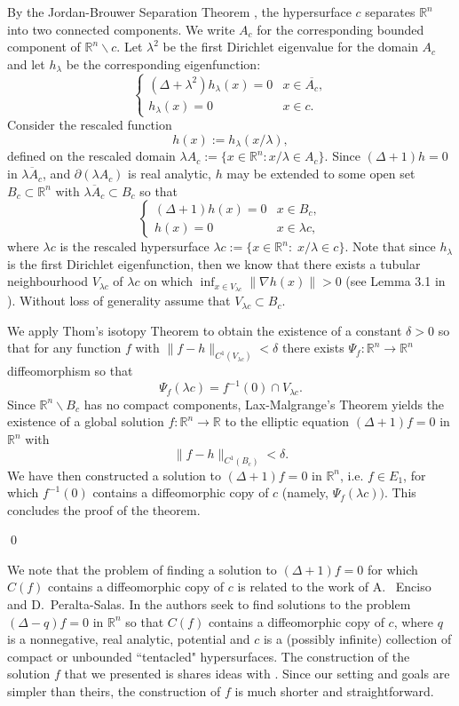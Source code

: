 \documentclass[11pt,reqno]{amsart}
\newcommand{\R}{{\mathbb R}}
\theoremstyle{definition}
\begin{document}
By the Jordan-Brouwer Separation Theorem \cite{Li}, the hypersurface $c$ separates $\R^n$ into two connected components. We write $A_c$ for the corresponding bounded component of $\R^n \backslash c$.
Let $\lambda^2$ be the first Dirichlet eigenvalue for the domain $A_c$ and let $h_\lambda$ be the corresponding eigenfunction: 
$$\begin{cases}
(\Delta + \lambda^2 )h_\lambda(x)=0& x \in \overline{A_c},\\
 h_\lambda(x)=0& x \in c.
\end{cases}$$
Consider the rescaled function $$h(x):=h_\lambda(x/\lambda),$$ defined on the rescaled domain $\lambda A_c:=\{x \in \R^n:  x/\lambda \in A_c\}$. 
Since $(\Delta + 1)h=0$ in $\overline{\lambda A_c}$, and $\partial (\lambda A_c)$ is real analytic, $h$ may be extended to some open set $B_c\subset \R^n$ with $\overline{\lambda A_c} \subset B_c$ so that
$$\begin{cases}
(\Delta + 1)h(x)=0& x \in B_c,\\
 h(x)=0& x \in  \lambda c,
\end{cases}$$
where $\lambda c$ is the rescaled hypersurface $\lambda c:= \{x \in \R^n:\; x/\lambda \in c\}$.
Note that since $h_\lambda$ is the first Dirichlet eigenfunction, then we know that there exists a tubular neighbourhood $V_{\lambda c}$ of $\lambda c$ on which  $\inf_{x \in V_{\lambda c}}\|\nabla h(x)\|>0$ (see Lemma 3.1 in \cite{BHM}). Without loss of generality assume that  $V_{\lambda c}\subset B_c$.

We apply Thom's isotopy Theorem \cite[Thm 20.2]{AR} to obtain the existence of a constant $\delta>0$ 
so that for any function $f$ with $\|f-h\|_{C^1(V_{\lambda c})} <\delta$ there exists $\Psi_f :\R^n \to \R^n$ diffeomorphism so that
$$\Psi_f(\lambda c)= f^{-1}(0) \cap V_{\lambda c}.$$
Since $\R^n \backslash B_c$ has no compact components,  Lax-Malgrange's Theorem \cite[p. 549]{Kr} yields the existence of a global solution $f:\R^n \to \R$ to the elliptic equation $(\Delta + 1)f=0$ in $\R^n$ with $$\|f-h\|_{C^1(B_c)}<\delta.$$
We have then constructed a solution to $(\Delta + 1)f=0$ in $\R^n$, i.e. $f\in E_1$,  for which $f^{-1}(0)$ contains a diffeomorphic copy of $c$ (namely, $\Psi_f(\lambda c))$. This concludes the proof of the theorem.

\qed

 We note that the problem of finding a solution  to $(\Delta+1)f=0$ for which $C(f)$ contains a diffeomorphic copy of $c$ is related to the work \cite{EP} of A.~ Enciso and D.~Peralta-Salas. In \cite{EP} the authors seek to find solutions to the problem $(\Delta -q)f=0$ in $\R^n$ so that $C(f)$  contains a diffeomorphic copy of $c$, where $q$ is a {nonnegative}, real analytic, potential and $c$ is a (possibly infinite) collection of compact or unbounded ``tentacled" hypersurfaces. The construction of the solution $f$ that we presented is shares ideas with \cite{EP}.  Since our setting and goals are simpler than theirs, the construction  of $f$  is much shorter and straightforward.
\end{document}

